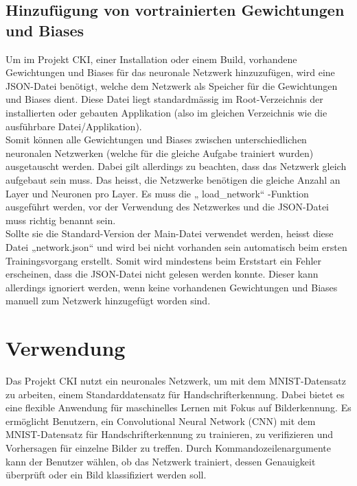 \subsection{Hinzufügung von vortrainierten Gewichtungen und Biases}
\label{sec:InstallHinzufügungVonVortrainiertenGewichtungenUndBiases}
Um im Projekt CKI, einer Installation oder einem Build, vorhandene Gewichtungen und Biases für das neuronale Netzwerk hinzuzufügen, wird eine JSON-Datei benötigt, welche dem Netzwerk als Speicher für die Gewichtungen und Biases dient. Diese Datei liegt standardmässig im Root-Verzeichnis der installierten oder gebauten Applikation (also im gleichen Verzeichnis wie die ausführbare Datei/Applikation).
\\
Somit können alle Gewichtungen und Biases zwischen unterschiedlichen neuronalen Netzwerken (welche für die gleiche Aufgabe trainiert wurden) ausgetauscht werden. Dabei gilt allerdings zu beachten, dass das Netzwerk gleich aufgebaut sein muss. Das heisst, die Netzwerke benötigen die gleiche Anzahl an Layer und Neuronen pro Layer. Es muss die „ load\_network“ -Funktion ausgeführt werden, vor der Verwendung des Netzwerkes und die JSON-Datei muss richtig benannt sein.
\\
Sollte sie die Standard-Version der Main-Datei verwendet werden, heisst diese Datei „network.json“ und wird bei nicht vorhanden sein automatisch beim ersten Trainingsvorgang erstellt. Somit wird mindestens beim Erststart ein Fehler erscheinen, dass die JSON-Datei nicht gelesen werden konnte. Dieser kann allerdings ignoriert werden, wenn keine vorhandenen Gewichtungen und Biases manuell zum Netzwerk hinzugefügt worden sind.

\section{Verwendung}
Das Projekt CKI nutzt ein neuronales Netzwerk, um mit dem MNIST-Datensatz zu arbeiten, einem Standarddatensatz für Handschrifterkennung. Dabei bietet es eine flexible Anwendung für maschinelles Lernen mit Fokus auf Bilderkennung. Es ermöglicht Benutzern, ein Convolutional Neural Network (CNN) mit dem MNIST-Datensatz für Handschrifterkennung zu trainieren, zu verifizieren und Vorhersagen für einzelne Bilder zu treffen. Durch Kommandozeilenargumente kann der Benutzer wählen, ob das Netzwerk trainiert, dessen Genauigkeit überprüft oder ein Bild klassifiziert werden soll. 

